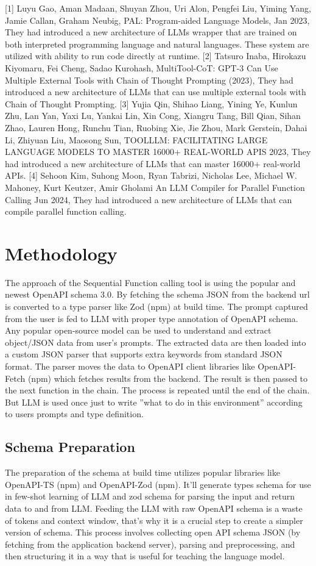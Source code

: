 \documentclass[conference]{IEEEtran}
\begin{document}
[1] Luyu Gao, Aman Madaan, Shuyan Zhou, Uri Alon, Pengfei Liu, Yiming
Yang, Jamie Callan, Graham Neubig, PAL: Program-aided
Language Models, Jan 2023, They had introduced a new architecture of LLMs wrapper that are trained on both interpreted programming language and natural languages. These system are utilized with ability to run code directly at runtime. [2] Tatsuro Inaba, Hirokazu Kiyomaru, Fei Cheng, Sadao Kurohash,
MultiTool-CoT: GPT-3 Can Use Multiple External Tools with Chain
of Thought Prompting (2023), They had introduced a new architecture of LLMs that can use multiple external tools with Chain of Thought Prompting. [3] Yujia Qin, Shihao Liang, Yining Ye, Kunlun Zhu, Lan Yan, Yaxi Lu,
Yankai Lin, Xin Cong, Xiangru Tang, Bill Qian, Sihan Zhao, Lauren
Hong, Runchu Tian, Ruobing Xie, Jie Zhou, Mark Gerstein, Dahai Li, Zhiyuan Liu, Maosong Sun, TOOLLLM: FACILITATING LARGE
LANGUAGE MODELS TO MASTER 16000+ REAL-WORLD APIS 2023, They had introduced a new architecture of LLMs that can master 16000+ real-world APIs. [4] Sehoon Kim, Suhong Moon, Ryan Tabrizi, Nicholas Lee, Michael W.
Mahoney, Kurt Keutzer, Amir Gholami An LLM Compiler
for Parallel Function Calling Jun 2024, They had introduced a new architecture of LLMs that can compile parallel function calling. 


\section{Methodology}
The approach of the Sequential Function calling tool is using the popular and newest OpenAPI schema 3.0. By fetching the schema JSON from the backend url is converted to a type parser like Zod (npm) at build time. The prompt captured from the user is fed to LLM with proper type annotation of OpenAPI schema. Any popular open-source model can be used to understand and extract object/JSON data from user's prompts. The extracted data are then loaded into a custom JSON parser that supports extra keywords from standard JSON format. The parser moves the data to OpenAPI client libraries like OpenAPI-Fetch (npm) which fetches results from the backend. The result is then passed to the next function in the chain. The process is repeated until the end of the chain. But LLM is used once just to write ”what to do in this environment” according to users prompts and type definition.

\subsection{Schema Preparation}\label{AA}
The preparation of the schema at build time utilizes popular libraries like OpenAPI-TS (npm) and OpenAPI-Zod (npm). It’ll generate types schema for use in few-shot learning of LLM and zod schema for parsing the input and return data to and from LLM. Feeding the LLM with raw OpenAPI schema is a waste of tokens and context window, that’s why it is a crucial step to create a simpler version of schema. This process involves collecting open API schema JSON (by fetching from the application backend server), parsing and preprocessing, and then structuring it in a way that is useful for teaching the language model. 
\end{document}
